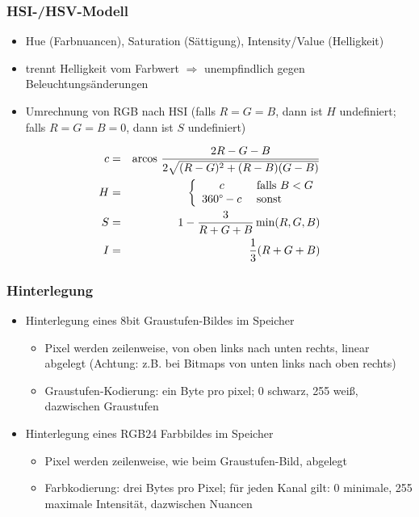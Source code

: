 \subsubsection{HSI-/HSV-Modell}

\begin{itemize}
\item Hue (Farbnuancen), Saturation (Sättigung), Intensity/Value (Helligkeit)
\item trennt Helligkeit vom Farbwert $\Rightarrow$ unempfindlich gegen Beleuchtungsänderungen
\item Umrechnung von RGB nach HSI (falls $R=G=B$, dann ist $H$ undefiniert; falls $R=G=B=0$, dann ist $S$ undefiniert)
\end{itemize}
\begin{eqnarray*}
c &=& \textrm{arcos } \frac{2R - G - B}{2 \sqrt{(R-G)^2 + (R-B)(G-B)}} \\
H &=& \left\{ \begin{array}{cl} c & \textrm{ falls } B < G \\ 360\degree - c & \textrm{ sonst} \end{array} \right. \\
S &=& 1 - \frac{3}{R+G+B} \min (R,G,B) \\
I &=& \frac{1}{3} (R + G + B)
\end{eqnarray*}

\subsubsection{Hinterlegung}

\begin{itemize}
\item Hinterlegung eines 8bit Graustufen-Bildes im Speicher
\begin{itemize}
\item Pixel werden zeilenweise, von oben links nach unten rechts, linear abgelegt (Achtung: z.B. bei Bitmaps von unten links nach oben rechts)
\item Graustufen-Kodierung: ein Byte pro pixel; 0 schwarz, 255 weiß, dazwischen Graustufen
\end{itemize}
\item Hinterlegung eines RGB24 Farbbildes im Speicher
\begin{itemize}
\item Pixel werden zeilenweise, wie beim Graustufen-Bild, abgelegt
\item Farbkodierung: drei Bytes pro Pixel; für jeden Kanal gilt: 0 minimale, 255 maximale Intensität, dazwischen Nuancen
\end{itemize}
\end{itemize}

